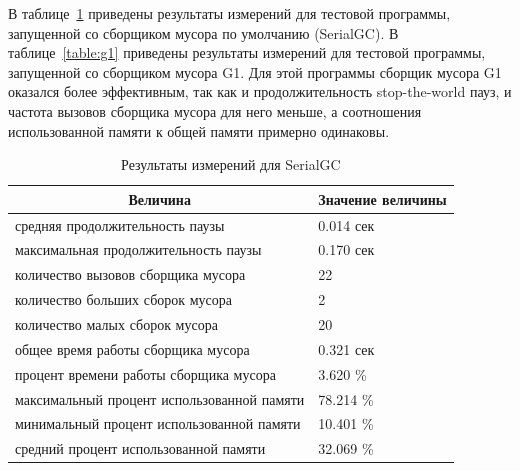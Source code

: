 В таблице~\ref{table:serialgc} приведены результаты измерений для тестовой программы, запущенной со сборщиком мусора по умолчанию (SerialGC).
В таблице~\ref{table:g1} приведены результаты измерений для тестовой программы, 
запущенной со сборщиком мусора G1. Для этой программы сборщик мусора G1 оказался
более эффективным, так как и продолжительность stop-the-world пауз, и частота вызовов 
сборщика мусора для него меньше, а соотношения использованной памяти к общей памяти
примерно одинаковы.

\begin{table}[h!]
\caption {Результаты измерений для SerialGC}
\label{table:serialgc}
\begin{center}
\begin{tabular}{|l|l|}
\hline
\multicolumn {1}{|c|}{Величина} & \multicolumn {1}{|c|}{Значение величины}\\
\hline
средняя продолжительность паузы & 0.014 сек\\
\hline
максимальная продолжительность паузы & 0.170 сек\\
\hline
количество вызовов сборщика мусора & 22\\
\hline
количество больших сборок мусора & 2 \\
\hline
количество малых сборок мусора & 20 \\
\hline
общее время работы сборщика мусора & 0.321 сек\\
\hline
процент времени работы сборщика мусора & 3.620 \%\\
\hline
максимальный процент использованной памяти & 78.214 \%\\
\hline
минимальный процент использованной памяти & 10.401 \%\\
\hline
средний процент использованной памяти & 32.069 \%\\
\hline
\end{tabular}
\end{center}
\end{table}

